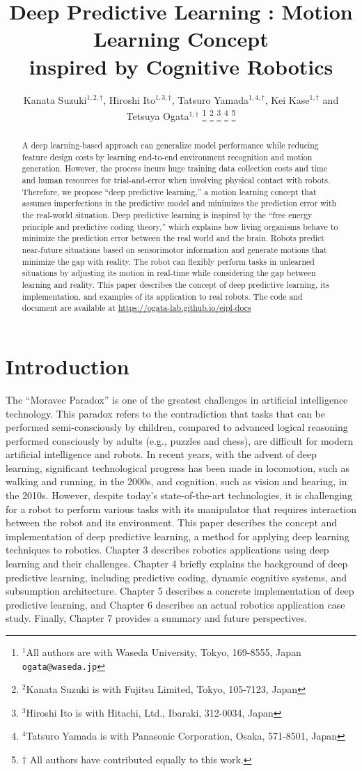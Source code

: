 \documentclass[letterpaper, 10 pt, conference, dvipdfmx]{ieeeconf}  %
\title{\LARGE \bf
Deep Predictive Learning : Motion Learning Concept\\
inspired by Cognitive Robotics
}
\author{ Kanata Suzuki$^{1,2,\dagger}$, Hiroshi Ito$^{1,3,\dagger}$, Tatsuro Yamada$^{1,4,\dagger}$, Kei Kase$^{1,\dagger}$ and Tetsuya Ogata$^{1,\dagger}$
\thanks{$^{1}$All authors are with Waseda University, Tokyo, 169-8555, Japan
        {\tt\small ogata@waseda.jp}}%
\thanks{$^{2}$Kanata Suzuki is with Fujitsu Limited, Tokyo, 105-7123, Japan}
\thanks{$^{3}$Hiroshi Ito is with Hitachi, Ltd., Ibaraki, 312-0034, Japan}
\thanks{$^{4}$Tatsuro Yamada is with Panasonic Corporation, Osaka, 571-8501, Japan}
\thanks{${\dagger}$ All authors have contributed equally to this work.}
}
\begin{document}
\maketitle
\thispagestyle{empty}
\pagestyle{empty}

\begin{abstract}
A deep learning-based approach can generalize model performance while reducing feature design costs by learning end-to-end environment recognition and motion generation. However, the process incurs huge training data collection costs and time and human resources for trial-and-error when involving physical contact with robots. Therefore, we propose ``deep predictive learning,'' a motion learning concept that assumes imperfections in the predictive model and minimizes the prediction error with the real-world situation. Deep predictive learning is inspired by the ``free energy principle and predictive coding theory,'' which explains how living organisms behave to minimize the prediction error between the real world and the brain. Robots predict near-future situations based on sensorimotor information and generate motions that minimize the gap with reality. The robot can flexibly perform tasks in unlearned situations by adjusting its motion in real-time while considering the gap between learning and reality. This paper describes the concept of deep predictive learning, its implementation, and examples of its application to real robots. The code and document are available at \url{https://ogata-lab.github.io/eipl-docs}
\end{abstract}

\section{Introduction}
The ``Moravec Paradox'' \cite{moravec1988mind} is one of the greatest challenges in artificial intelligence technology. This paradox refers to the contradiction that tasks that can be performed semi-consciously by children, compared to advanced logical reasoning performed consciously by adults (e.g., puzzles and chess), are difficult for modern artificial intelligence and robots. In recent years, with the advent of deep learning, significant technological progress has been made in locomotion, such as walking and running, in the 2000s, and cognition, such as vision and hearing, in the 2010s. However, despite today's state-of-the-art technologies, it is challenging for a robot to perform various tasks with its manipulator that requires interaction between the robot and its environment. This paper describes the concept and implementation of deep predictive learning, a method for applying deep learning techniques to robotics. Chapter 3 describes robotics applications using deep learning and their challenges. Chapter 4 briefly explains the background of deep predictive learning, including predictive coding, dynamic cognitive systems, and subsumption architecture. Chapter 5 describes a concrete implementation of deep predictive learning, and Chapter 6 describes an actual robotics application case study. Finally, Chapter 7 provides a summary and future perspectives.
\end{document}

